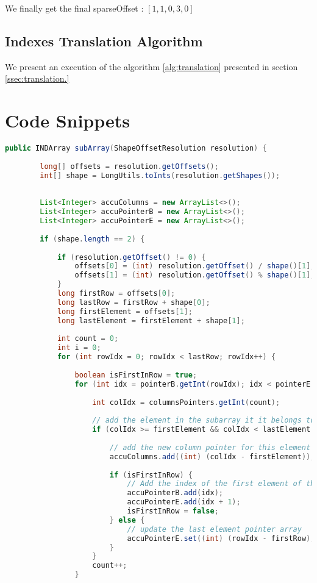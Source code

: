 	We finally get the final sparseOffset : $[1, 1, 0, 3, 0]$
	
	
\subsection{Indexes Translation Algorithm}
	
	We present an execution of the algorithm \ref{alg:translation} presented in section \ref{ssec:translation.}

\section{Code Snippets}

\label{ch:codesnip}

\begin{lstlisting}[caption=Extract a sub-array of a CSR matrix\label{lst:getcsc},language=Java]
	public INDArray subArray(ShapeOffsetResolution resolution) {
		
		long[] offsets = resolution.getOffsets();
		int[] shape = LongUtils.toInts(resolution.getShapes());
		
		
		List<Integer> accuColumns = new ArrayList<>();
		List<Integer> accuPointerB = new ArrayList<>();
		List<Integer> accuPointerE = new ArrayList<>();
		
		if (shape.length == 2) {
		
			if (resolution.getOffset() != 0) {
				offsets[0] = (int) resolution.getOffset() / shape()[1];
				offsets[1] = (int) resolution.getOffset() % shape()[1];
			}
			long firstRow = offsets[0];
			long lastRow = firstRow + shape[0];
			long firstElement = offsets[1];
			long lastElement = firstElement + shape[1];
			
			int count = 0;
			int i = 0;
			for (int rowIdx = 0; rowIdx < lastRow; rowIdx++) {	
				
				boolean isFirstInRow = true;
				for (int idx = pointerB.getInt(rowIdx); idx < pointerE.getInt(rowIdx); idx++) {
				
					int colIdx = columnsPointers.getInt(count);
					
					// add the element in the subarray it it belongs to the view
					if (colIdx >= firstElement && colIdx < lastElement && rowIdx >= firstRow && rowIdx < lastRow) {
						
						// add the new column pointer for this element
						accuColumns.add((int) (colIdx - firstElement));
						
						if (isFirstInRow) {
							// Add the index of the first element of the row in the pointer array
							accuPointerB.add(idx);
							accuPointerE.add(idx + 1);
							isFirstInRow = false;
						} else {
							// update the last element pointer array
							accuPointerE.set((int) (rowIdx - firstRow), idx + 1);
						}
					}			
					count++;
				}
				

\end{lstlisting}

